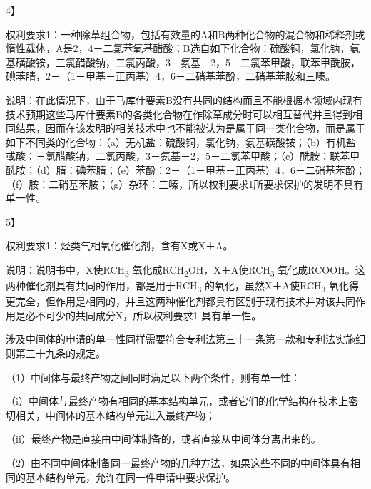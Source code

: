 {4】\par}

权利要求1：一种除草组合物，包括有效量的A和B两种化合物的混合物和稀释剂或惰性载体，A是2，4－二氯苯氧基醋酸；B选自如下化合物：硫酸铜，氯化钠，氨基磺酸铵，三氯醋酸钠，二氯丙酸，3－氨基－2，5－二氯苯甲酸，联苯甲酰胺，碘苯腈，2－（1－甲基－正丙基）4，6－二硝基苯酚，二硝基苯胺和三嗪。

说明：在此情况下，由于马库什要素B没有共同的结构而且不能根据本领域内现有技术预期这些马库什要素B的各类化合物在作除草成分时可以相互替代并且得到相同结果，因而在该发明的相关技术中也不能被认为是属于同一类化合物，而是属于如下不同类的化合物：（a）无机盐：硫酸铜，氯化钠，氨基磺酸铵；（b）有机盐或酸：三氯醋酸钠，二氯丙酸，3－氨基－2，5－二氯苯甲酸；（c）酰胺：联苯甲酰胺；（d）腈：碘苯腈；（e）苯酚：2－（1－甲基－正丙基）4，6－二硝基苯酚；（f）胺：二硝基苯胺；（g）杂环：三嗪，所以权利要求1所要求保护的发明不具有单一性。

{5】\par}

权利要求1：烃类气相氧化催化剂，含有X或X＋A。

说明：说明书中，X使RCH\textsubscript{3} 氧化成RCH\textsubscript{2}OH，X＋A使RCH\textsubscript{3} 氧化成RCOOH。这两种催化剂具有共同的作用，都是用于RCH\textsubscript{3} 的氧化，虽然X＋A使RCH\textsubscript{3} 氧化得更完全，但作用是相同的，并且这两种催化剂都具有区别于现有技术并对该共同作用是必不可少的共同成分X，所以权利要求1 具有单一性。

涉及中间体的申请的单一性同样需要符合专利法第三十一条第一款和专利法实施细则第三十九条的规定。

{\setlength{\parindent}{17.1bp}（1）中间体与最终产物之间同时满足以下两个条件，则有单一性：\par}

{\setlength{\parindent}{17.1bp}（i）中间体与最终产物有相同的基本结构单元，或者它们的化学结构在技术上密切相关，中间体的基本结构单元进入最终产物；\par}

{\setlength{\parindent}{17.1bp}（ii）最终产物是直接由中间体制备的，或者直接从中间体分离出来的。\par}

{\setlength{\parindent}{17.1bp}（2）由不同中间体制备同一最终产物的几种方法，如果这些不同的中间体具有相同的基本结构单元，允许在同一件申请中要求保护。\par}

